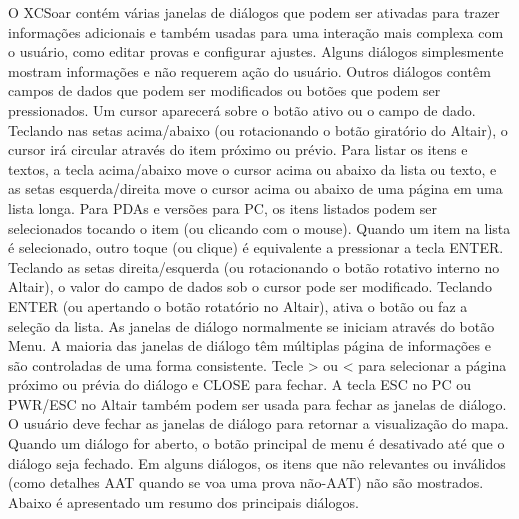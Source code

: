 O XCSoar contém várias janelas de diálogos que podem ser ativadas para trazer informações adicionais e também usadas para uma interação mais complexa com o usuário, como editar provas e configurar ajustes.
Alguns diálogos simplesmente mostram informações e não requerem ação do usuário.  Outros diálogos contêm campos de dados que podem ser modificados ou botões que podem ser pressionados.
Um cursor aparecerá sobre o botão ativo ou o campo de dado.  Teclando nas setas acima/abaixo (ou rotacionando o botão giratório do Altair), o cursor irá circular através do item próximo ou prévio.  Para listar os itens e textos, a tecla acima/abaixo move o cursor acima ou abaixo da lista ou texto, e as setas esquerda/direita move o cursor acima ou abaixo de uma página em uma lista longa.
Para PDAs e versões para PC, os itens listados podem ser selecionados tocando o item (ou clicando com o mouse).  Quando um item na lista é selecionado, outro toque (ou clique) é equivalente a pressionar a tecla ENTER.
Teclando as setas direita/esquerda (ou rotacionando o botão rotativo interno no Altair), o valor do campo de dados sob o cursor pode ser modificado.  Teclando ENTER (ou apertando o botão rotatório no Altair), ativa o botão ou faz a seleção da lista.
As janelas de diálogo normalmente se iniciam através do botão Menu.
A maioria das janelas de diálogo têm múltiplas página de informações e são controladas de uma forma consistente.  Tecle > ou < para selecionar a página próximo ou prévia do diálogo e CLOSE para fechar.
A tecla ESC no PC ou PWR/ESC no Altair também podem ser usada para fechar as janelas de diálogo.
O usuário deve fechar as janelas de diálogo para retornar a visualização do mapa.  Quando um diálogo for aberto, o botão principal de menu é desativado até que o diálogo seja fechado.
Em alguns diálogos, os itens que não relevantes ou inválidos (como detalhes AAT quando se voa uma prova não-AAT) não são mostrados.
 Abaixo é apresentado um resumo dos principais diálogos.

